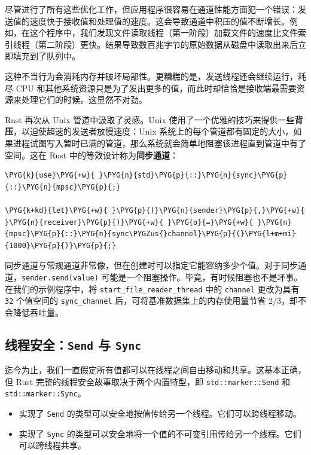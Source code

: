 尽管进行了所有这些优化工作，但应用程序很容易在通道性能方面犯一个错误：发送值的速度快于接收值和处理值的速度。这会导致通道中积压的值不断增长。例如，在这个程序中，我们发现文件读取线程（第一阶段）加载文件的速度比文件索引线程（第二阶段）更快。结果导致数百兆字节的原始数据从磁盘中读取出来后立即填充到了队列中。

这种不当行为会消耗内存并破坏局部性。更糟糕的是，发送线程还会继续运行，耗尽 CPU 和其他系统资源只是为了发出更多的值，而此时却恰恰是接收端最需要资源来处理它们的时候。这显然不对劲。

Rust 再次从 Unix 管道中汲取了灵感。Unix 使用了一个优雅的技巧来提供一些\textbf{背压}，以迫使超速的发送者放慢速度：Unix 系统上的每个管道都有固定的大小，如果进程试图写入暂时已满的管道，那么系统就会简单地阻塞该进程直到管道中有了空间。这在 Rust 中的等效设计称为\textbf{同步通道}：

\begin{Verbatim}[commandchars=\\\{\},breaklines=true,breakanywhere=true,fontsize=\codefont,xleftmargin=17bp]
\PYG{k}{use}\PYG{+w}{ }\PYG{n}{std}\PYG{p}{::}\PYG{n}{sync}\PYG{p}{::}\PYG{n}{mpsc}\PYG{p}{;}

\PYG{k+kd}{let}\PYG{+w}{ }\PYG{p}{(}\PYG{n}{sender}\PYG{p}{,}\PYG{+w}{ }\PYG{n}{receiver}\PYG{p}{)}\PYG{+w}{ }\PYG{o}{=}\PYG{+w}{ }\PYG{n}{mpsc}\PYG{p}{::}\PYG{n}{sync\PYGZus{}channel}\PYG{p}{(}\PYG{l+m+mi}{1000}\PYG{p}{)}\PYG{p}{;}
\end{Verbatim}

同步通道与常规通道非常像，但在创建时可以指定它能容纳多少个值。对于同步通道，\texttt{sender.send(value)} 可能是一个阻塞操作。毕竟，有时候阻塞也不是坏事。在我们的示例程序中，将 \texttt{start\_file\_reader\_thread} 中的 \texttt{channel} 更改为具有 \texttt{32} 个值空间的 \texttt{sync\_channel} 后，可将基准数据集上的内存使用量节省 2/3，却不会降低吞吐量。

\subsection{线程安全：\texttt{Send} 与 \texttt{Sync}}

迄今为止，我们一直假定所有值都可以在线程之间自由移动和共享。这基本正确，但 Rust 完整的线程安全故事取决于两个内置特型，即 \texttt{std::marker::Send} 和 \texttt{std::marker::Sync}。

\begin{itemize}
\item 实现了 \texttt{Send} 的类型可以安全地按值传给另一个线程。它们可以跨线程移动。
\item 实现了 \texttt{Sync} 的类型可以安全地将一个值的不可变引用传给另一个线程。它们可以跨线程共享。
\end{itemize}

